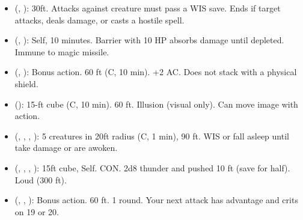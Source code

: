 \begin{itemize}
	\item {} (, ): 30ft. Attacks against creature must pass a WIS save. Ends if target attacks, deals damage, or casts a hostile spell.
	\item {} (, ): Self, 10 minutes. Barrier with 10 HP absorbs damage until depleted. Immune to magic missile.
	\item {} (, ): Bonus action. 60 ft (C, 10 min). +2 AC. Does not stack with a physical shield. 
	\item {} (): 15-ft cube (C, 10 min). 60 ft. Illusion (visual only). Can move image with action. 
	\item {} (, , , ): 5 creatures in 20ft radius (C, 1 min), 90 ft. WIS or fall asleep until take damage or are awoken.
	\item {} (, , , ): 15ft cube, Self. CON. 2d8 thunder and pushed 10 ft (save for half). Loud (300 ft).
	\item {} (, , ): Bonus action. 60 ft. 1 round. Your next attack has advantage and crits on 19 or 20.
\end{itemize}

